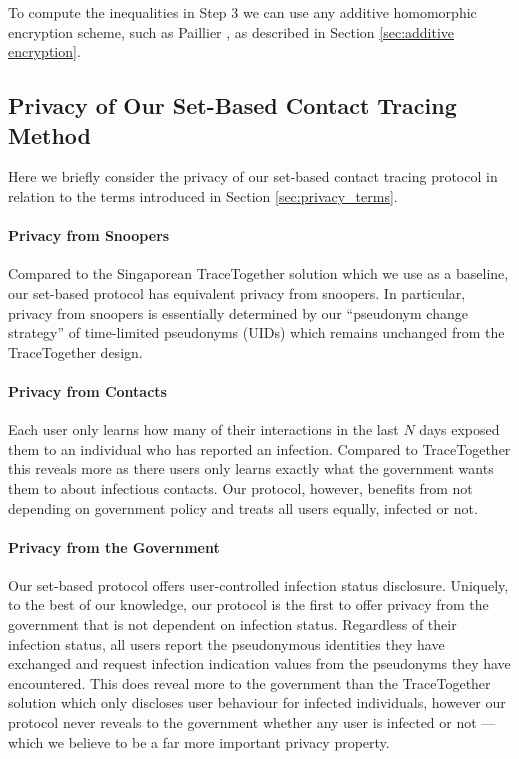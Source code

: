 \documentclass{article}
\begin{document}
To compute the inequalities in Step 3 we can use any additive homomorphic encryption scheme, such as Paillier \cite{DBLP:conf/eurocrypt/Paillier99}, as described in Section \ref{sec:additive encryption}.

\subsection{Privacy of Our Set-Based Contact Tracing Method} \label{sec:privacy of set based method}
Here we briefly consider the privacy of our set-based contact tracing protocol in relation to the terms introduced in Section \ref{sec:privacy_terms}.


\paragraph{Privacy from Snoopers}
Compared to the Singaporean TraceTogether solution which we use as a baseline, our set-based protocol has equivalent privacy from snoopers. In particular, privacy from snoopers is essentially determined by our ``pseudonym change strategy'' of time-limited pseudonyms (UIDs) which remains unchanged from the TraceTogether design. 

\paragraph{Privacy from Contacts}
Each user only learns how many of their interactions in the last $N$ days exposed them to an individual who has reported an infection. Compared to TraceTogether this reveals more as there users only learns exactly what the government wants them to about infectious contacts. Our protocol, however, benefits from not depending on government policy and treats all users equally, infected or not.

\paragraph{Privacy from the Government}

Our set-based protocol offers user-controlled infection status disclosure. Uniquely, to the best of our knowledge, our protocol is the first to offer privacy from the government that is not dependent on infection status. Regardless of their infection status, all users report the pseudonymous identities they have exchanged and request infection indication values from the pseudonyms they have encountered. This does reveal more to the government than the TraceTogether solution which only discloses user behaviour for infected individuals, however our protocol never reveals to the government whether any user is infected or not --- which we believe to be a far more important privacy property.
\end{document}

